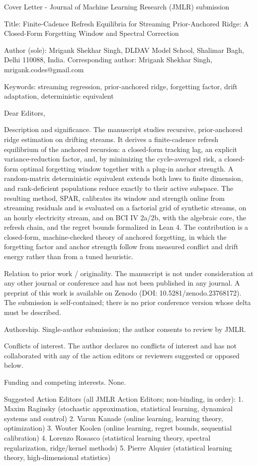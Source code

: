\documentclass[11pt]{article}
\begin{document}
Cover Letter - Journal of Machine Learning Research (JMLR) submission

Title: Finite-Cadence Refresh Equilibria for Streaming Prior-Anchored Ridge: A
Closed-Form Forgetting Window and Spectral Correction

Author (sole): Mrigank Shekhar Singh, DLDAV Model School, Shalimar Bagh, Delhi
110088, India.  Corresponding author: Mrigank Shekhar Singh, mrigank.codes@gmail.com

Keywords: streaming regression, prior-anchored ridge, forgetting factor, drift
adaptation, deterministic equivalent

Dear Editors,

Description and significance.
The manuscript studies recursive, prior-anchored ridge estimation on drifting
streams. It derives a finite-cadence refresh equilibrium of the anchored
recursion: a closed-form tracking lag, an explicit variance-reduction factor,
and, by minimizing the cycle-averaged risk, a closed-form optimal forgetting
window together with a plug-in anchor strength. A random-matrix deterministic
equivalent extends both laws to finite dimension, and rank-deficient populations
reduce exactly to their active subspace. The resulting method, SPAR, calibrates its window and strength online
from streaming residuals and is evaluated on a factorial grid of synthetic
streams, on an hourly electricity stream, and on BCI IV 2a/2b, with the
algebraic core, the refresh chain, and the regret bounds formalized in Lean 4.
The contribution is a closed-form, machine-checked theory of anchored
forgetting, in which the forgetting factor and anchor strength follow from
measured conflict and drift energy rather than from a tuned heuristic.

Relation to prior work / originality.
The manuscript is not under consideration at any other journal or conference and
has not been published in any journal. A preprint of this work is available on
Zenodo (DOI: 10.5281/zenodo.23768172). The submission is self-contained; there
is no prior conference version whose delta must be described.

Authorship.
Single-author submission; the author consents to review by JMLR.

Conflicts of interest.
The author declares no conflicts of interest and has not collaborated with any
of the action editors or reviewers suggested or opposed below.

Funding and competing interests.
None.

Suggested Action Editors (all JMLR Action Editors; non-binding, in order):
  1. Maxim Raginsky (stochastic approximation, statistical learning,
     dynamical systems and control)
  2. Varun Kanade (online learning, learning theory, optimization)
  3. Wouter Koolen (online learning, regret bounds, sequential calibration)
  4. Lorenzo Rosasco (statistical learning theory, spectral regularization,
     ridge/kernel methods)
  5. Pierre Alquier (statistical learning theory, high-dimensional statistics)
\end{document}
